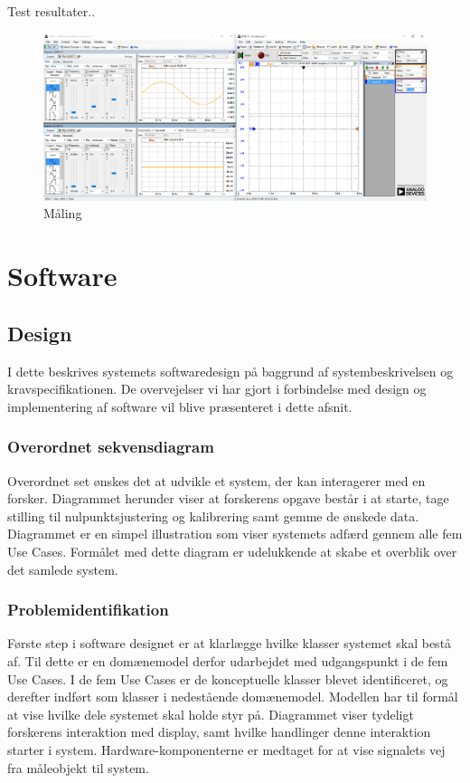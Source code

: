 Test resultater.. 
\begin{figure}[H]
	\centering	\includegraphics[width=1.0\textwidth]{Figurer/vandtest}
	\caption{Måling}
	\label{fig:vandtest_måling}
\end{figure} 


\section{Software}
\subsection{Design}
I dette beskrives systemets softwaredesign på baggrund af systembeskrivelsen og kravspecifikationen. De overvejelser vi har gjort i forbindelse med design og implementering af software vil blive præsenteret i dette afsnit. 

\subsubsection{Overordnet sekvensdiagram}
Overordnet set ønskes det at udvikle et system, der kan interagerer med en forsker. Diagrammet herunder viser at forskerens opgave består i at starte, tage stilling til nulpunktsjustering og kalibrering samt gemme de ønskede data. Diagrammet er en simpel illustration som viser systemets adfærd gennem alle fem Use Cases. Formålet med dette diagram er udelukkende at skabe et overblik over det samlede system.

\subsubsection{Problemidentifikation}
Første step i software designet er at klarlægge hvilke klasser systemet skal bestå af. Til dette er en domænemodel derfor udarbejdet med udgangspunkt i de fem Use Cases. I de fem Use Cases er de konceptuelle klasser blevet identificeret, og derefter indført som klasser i nedestående domænemodel. Modellen har til formål at vise hvilke dele systemet skal holde styr på. 
Diagrammet viser tydeligt forskerens interaktion med display, samt hvilke handlinger denne interaktion starter i system. Hardware-komponenterne er medtaget for at vise signalets vej fra måleobjekt til system. 

